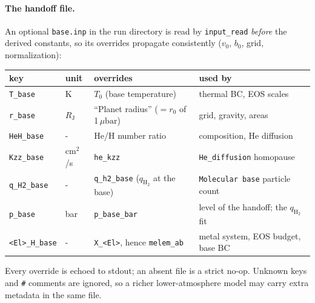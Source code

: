 \documentclass[english,a4paper]{my_memo}
\newcommand{\RJ}{R_{\mathrm{J}}}
\newcommand{\ubar}{\mu\mathrm{bar}}
\newcommand{\qHH}{q_{\mathrm{H_2}}}
\begin{document}
\paragraph{The handoff file.} An optional \texttt{base.inp} in the run directory is read
by \texttt{input\_read} \emph{before} the derived constants, so its overrides propagate
consistently ($v_0$, $b_0$, grid, normalization):
\begin{center}\small
\begin{tabular}{@{}llll@{}}
\toprule
key & unit & overrides & used by \\
\midrule
\texttt{T\_base}   & K     & $T_0$ (base temperature)          & thermal BC, EOS scales \\
\texttt{r\_base}   & $\RJ$ & ``Planet radius'' ($=r_0$ of 1\,$\ubar$) & grid, gravity, areas \\
\texttt{HeH\_base} & -     & He/H number ratio                 & composition, He diffusion \\
\texttt{Kzz\_base} & cm$^2$/s & \texttt{he\_kzz}               & \texttt{He\_diffusion} homopause \\
\texttt{q\_H2\_base} & -   & \texttt{q\_h2\_base} ($\qHH$ at the base) & \texttt{Molecular base} particle count \\
\texttt{p\_base}   & bar   & \texttt{p\_base\_bar}             & level of the handoff; the $\qHH$ fit \\
\texttt{<El>\_H\_base} & - & \texttt{X\_<El>}, hence \texttt{melem\_ab} & metal system, EOS budget, base BC \\
\bottomrule
\end{tabular}
\end{center}
Every override is echoed to stdout; an absent file is a strict no-op. Unknown keys and
\texttt{\#} comments are ignored, so a richer lower-atmosphere model may carry extra
metadata in the same file.
\end{document}

